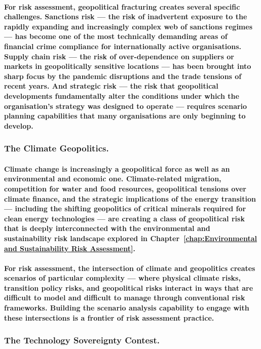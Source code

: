 \paragraph{For risk assessment, geopolitical fracturing creates several specific challenges. Sanctions risk — the risk of inadvertent exposure to the rapidly expanding and increasingly complex web of sanctions regimes — has become one of the most technically demanding areas of financial crime compliance for internationally active organisations. Supply chain risk — the risk of over-dependence on suppliers or markets in geopolitically sensitive locations — has been brought into sharp focus by the pandemic disruptions and the trade tensions of recent years. And strategic risk — the risk that geopolitical developments fundamentally alter the conditions under which the organisation's strategy was designed to operate — requires scenario planning capabilities that many organisations are only beginning to develop.}
\subsubsection{The Climate Geopolitics.}
\paragraph{Climate change is increasingly a geopolitical force as well as an environmental and economic one. Climate-related migration, competition for water and food resources, geopolitical tensions over climate finance, and the strategic implications of the energy transition — including the shifting geopolitics of critical minerals required for clean energy technologies — are creating a class of geopolitical risk that is deeply interconnected with the environmental and sustainability risk landscape explored in Chapter~\ref{chap:Environmental and Sustainability Risk Assessment}.}
\paragraph{For risk assessment, the intersection of climate and geopolitics creates scenarios of particular complexity — where physical climate risks, transition policy risks, and geopolitical risks interact in ways that are difficult to model and difficult to manage through conventional risk frameworks. Building the scenario analysis capability to engage with these intersections is a frontier of risk assessment practice.}
\subsubsection{The Technology Sovereignty Contest.}
